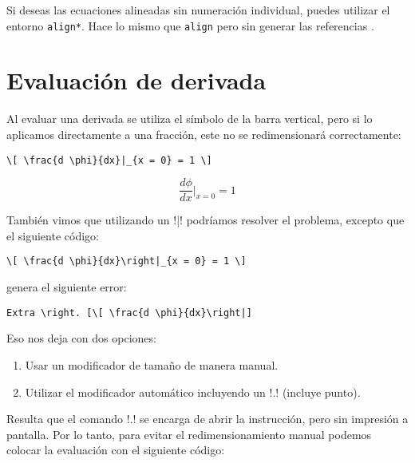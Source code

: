 Si deseas las ecuaciones alineadas sin numeración individual, puedes utilizar el entorno \texttt{align*}. Hace lo mismo que \texttt{align} pero sin generar las referencias \cite{bib:math_align}.



\section{Evaluación de derivada}
\label{sec:evaluacion_de_derivada}



Al evaluar una derivada se utiliza el símbolo de la barra vertical, pero si lo aplicamos directamente a una fracción, este no se redimensionará correctamente:

\lstrulet
\noindent \begin{minipage}{0.75\linewidth}
\vspace{1.5mm}
\begin{lstlisting}[style=latex,frame={}]
\[ \frac{d \phi}{dx}|_{x = 0} = 1 \]
\end{lstlisting}
\end{minipage}
\begin{minipage}{0.25\linewidth}
\[ \frac{d \phi}{dx}|_{x = 0} = 1 \]
\end{minipage}
\lstruleb

También vimos que utilizando un !\right|! podríamos resolver el problema, excepto que el siguiente código:

\begin{lstlisting}[style=latex,numbers=none]
\[ \frac{d \phi}{dx}\right|_{x = 0} = 1 \]
\end{lstlisting}

\noindent genera el siguiente error:

\begin{lstlisting}[style=errores]
Extra \right. [\[ \frac{d \phi}{dx}\right|]
\end{lstlisting}

Eso nos deja con dos opciones:
\begin{enumerate}
	\item Usar un modificador de tamaño de manera manual.
	\item Utilizar el modificador automático incluyendo un !\left.! (incluye punto).
\end{enumerate}

Resulta que el comando !\left.! se encarga de abrir la instrucción, pero sin impresión a pantalla. Por lo tanto, para evitar el redimensionamiento manual podemos colocar la evaluación con el siguiente código:

